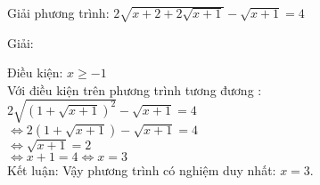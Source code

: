 \begin{vd}
  Giải phương trình: $ 2\sqrt{x+2+2\sqrt{x+1}}-\sqrt{x+1}=4 $
\end{vd}
\begin{center}
    Giải:
\end{center}

Điều kiện: $ x\geq -1 $ \\
Với điều kiện trên phương trình tương đương : \\
$ 2\sqrt{(1 +\sqrt{x+1})^2} - \sqrt{x+1} =4 $ \\
$ \Leftrightarrow 
    2(1+\sqrt{x+1}) -\sqrt{x+1} =4 $\\
$ \Leftrightarrow 
    \sqrt{x+1} =2 $\\
$ \Leftrightarrow 
    x+1 =4 \Leftrightarrow 
    x=3$\\
Kết luận: Vậy phương trình có nghiệm duy nhất: $ x=3 $.
